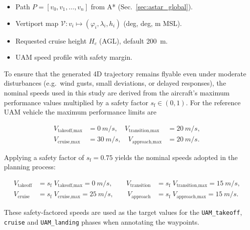 \begin{itemize}
  \item Path $P = [v_0, v_1, \dots, v_n]$ from A* (Sec.~\ref{sec:astar_global}).
  \item Vertiport map $\mathcal{V}: v_i \mapsto (\varphi_i, \lambda_i, h_i)$ (deg, deg, m MSL).
  \item Requested cruise height $H_c$ (AGL), default \SI{200}{m}.
  \item UAM speed profile with safety margin.
\end{itemize}

To ensure that the generated 4D trajectory remains flyable even under moderate disturbances 
(e.g.\ wind gusts, small deviations, or delayed responses), the nominal speeds used in this study 
are derived from the aircraft’s maximum performance values multiplied by a safety factor 
\(s_{\text{f}}\in(0,1)\).  
For the reference UAM vehicle the maximum performance limits are

\[
\begin{aligned}
    V_{\text{takeoff,max}}   &= \SI{0}{m/s}, \quad
    V_{\text{transition,max}} &= \SI{20}{m/s}, \\
    V_{\text{cruise,max}}     &= \SI{30}{m/s}, \quad
    V_{\text{approach,max}}   &= \SI{20}{m/s}.
\end{aligned}
\]

Applying a safety factor of \(s_{\text{f}}=0.75\) yields the nominal speeds adopted in the planning process:

\[
\begin{aligned}
    V_{\text{takeoff}}   &= s_{\text{f}}\;V_{\text{takeoff,max}} = \SI{0}{m/s}, \qquad
    V_{\text{transition}} &= s_{\text{f}}\;V_{\text{transition,max}} = \SI{15}{m/s},\\[0.5em]
    V_{\text{cruise}}    &= s_{\text{f}}\;V_{\text{cruise,max}} = \SI{25}{m/s}, \qquad
    V_{\text{approach}}  &= s_{\text{f}}\;V_{\text{approach,max}} = \SI{15}{m/s}.
\end{aligned}
\]


These safety-factored speeds are used as the target values for the 
\texttt{UAM\_takeoff}, \texttt{cruise} and \texttt{UAM\_landing} phases when 
annotating the waypoints.


